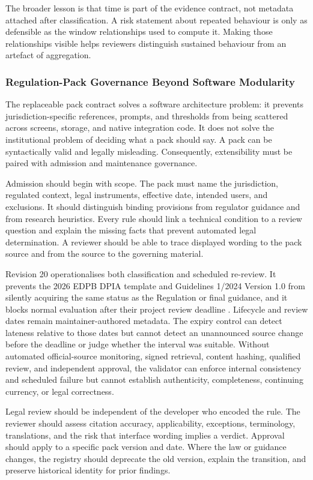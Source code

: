 The broader lesson is that time is part of the evidence contract, not metadata attached after classification. A risk statement about repeated behaviour is only as defensible as the window relationships used to compute it. Making those relationships visible helps reviewers distinguish sustained behaviour from an artefact of aggregation.

\subsubsection{Regulation-Pack Governance Beyond Software Modularity}

The replaceable pack contract solves a software architecture problem: it prevents jurisdiction-specific references, prompts, and thresholds from being scattered across screens, storage, and native integration code. It does not solve the institutional problem of deciding what a pack should say. A pack can be syntactically valid and legally misleading. Consequently, extensibility must be paired with admission and maintenance governance.

Admission should begin with scope. The pack must name the jurisdiction, regulated context, legal instruments, effective date, intended users, and exclusions. It should distinguish binding provisions from regulator guidance and from research heuristics. Every rule should link a technical condition to a review question and explain the missing facts that prevent automated legal determination. A reviewer should be able to trace displayed wording to the pack source and from the source to the governing material.

Revision 20 operationalises both classification and scheduled re-review. It prevents the 2026 EDPB DPIA template and Guidelines 1/2024 Version 1.0 from silently acquiring the same status as the Regulation or final guidance, and it blocks normal evaluation after their project review deadline \cite{edpblia2024draft,edpbdpia2026consultation}. Lifecycle and review dates remain maintainer-authored metadata. The expiry control can detect lateness relative to those dates but cannot detect an unannounced source change before the deadline or judge whether the interval was suitable. Without automated official-source monitoring, signed retrieval, content hashing, qualified review, and independent approval, the validator can enforce internal consistency and scheduled failure but cannot establish authenticity, completeness, continuing currency, or legal correctness.

Legal review should be independent of the developer who encoded the rule. The reviewer should assess citation accuracy, applicability, exceptions, terminology, translations, and the risk that interface wording implies a verdict. Approval should apply to a specific pack version and date. Where the law or guidance changes, the registry should deprecate the old version, explain the transition, and preserve historical identity for prior findings.

